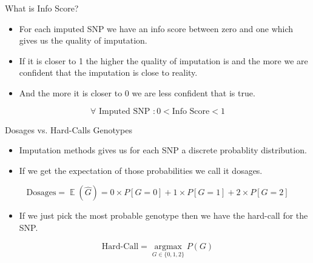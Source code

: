 \documentclass{beamer}
\DeclareMathOperator{\E}{\mathbb{E}}
\begin{document}
\begin{frame}{What is Info Score?}

      \begin{itemize}
            \item For each imputed SNP we have an info score between zero and one which gives us the quality of imputation.
            \item If it is closer to 1 the higher the quality of imputation is and the more we are confident that the imputation is close to reality. 
            \item And the more it is closer to 0 we are less confident that is true.
      \end{itemize}

      \[ \forall \text{ Imputed SNP } : 0 < \text{Info Score} < 1\]

\end{frame}



\begin{frame}{Dosages vs. Hard-Calls Genotypes}

      \begin{itemize}
            \item Imputation methods gives us for each SNP a discrete probablity distribution.
            \item If we get the expectation of those probabilities we call it dosages. %
      \end{itemize}

      \[
           \text{Dosages} = \E(\hat{G}) = 0\times P[G=0] + 1\times P[G=1] + 2 \times P[G=2]  
      \]

      \begin{itemize}
            \item If we just pick the most probable genotype then we have the hard-call for the SNP.
      \end{itemize}

      \[
            \text{Hard-Call} = \operatorname*{argmax}_{G \in \{0,1,2\}} P(G)
      \]

\end{frame}
\end{document}
